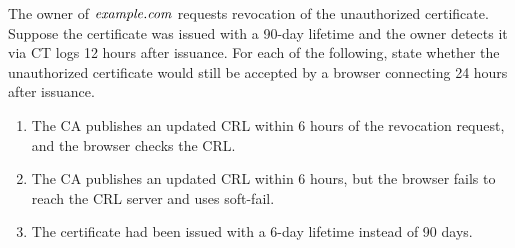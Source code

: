 \documentclass[11pt]{article}
\begin{document}
\begin{task}\rm
  The owner of $\mathit{example.com}$ requests revocation of the
  unauthorized certificate.  Suppose the certificate was issued with
  a 90-day lifetime and the owner detects it via CT logs 12 hours
  after issuance.  For each of the following, state whether the
  unauthorized certificate would still be accepted by a browser
  connecting 24 hours after issuance.
  \begin{enumerate}
  \item The CA publishes an updated CRL within 6 hours of the
    revocation request, and the browser checks the CRL.
  \item The CA publishes an updated CRL within 6 hours, but the
    browser fails to reach the CRL server and uses soft-fail.
  \item The certificate had been issued with a 6-day lifetime instead
    of 90 days.
  \end{enumerate}
\end{task}



\end{document}
